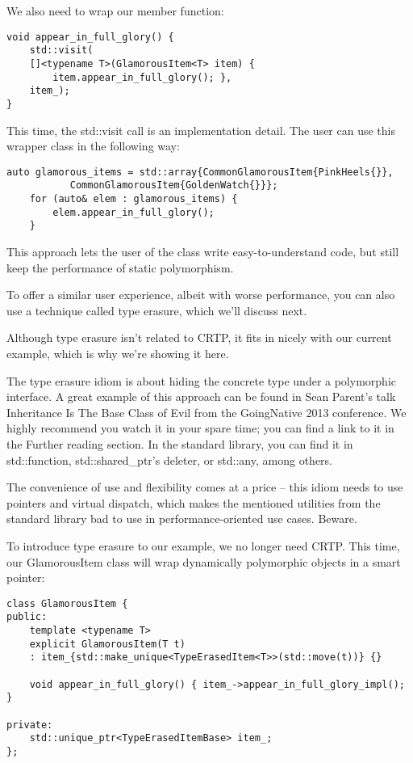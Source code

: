 We also need to wrap our member function:

\begin{lstlisting}[style=styleCXX]
void appear_in_full_glory() {
	std::visit(
	[]<typename T>(GlamorousItem<T> item) {
		item.appear_in_full_glory(); },
	item_);
}
\end{lstlisting}

This time, the std::visit call is an implementation detail. The user can use this wrapper class in the following way:

\begin{lstlisting}[style=styleCXX]
auto glamorous_items = std::array{CommonGlamorousItem{PinkHeels{}},
		   CommonGlamorousItem{GoldenWatch{}}};
	for (auto& elem : glamorous_items) {
		elem.appear_in_full_glory();
	}
\end{lstlisting}

This approach lets the user of the class write easy-to-understand code, but still keep the performance of static polymorphism.

To offer a similar user experience, albeit with worse performance, you can also use a technique called type erasure, which we'll discuss next.


Although type erasure isn't related to CRTP, it fits in nicely with our current example, which is why we're showing it here.

The type erasure idiom is about hiding the concrete type under a polymorphic interface. A great example of this approach can be found in Sean Parent's talk Inheritance Is The Base Class of Evil from the GoingNative 2013 conference. We highly recommend you watch it in your spare time; you can find a link to it in the Further reading section. In the standard library, you can find it in std::function, std::shared\_ptr's deleter, or std::any, among others.

The convenience of use and flexibility comes at a price – this idiom needs to use pointers and virtual dispatch, which makes the mentioned utilities from the standard library bad to use in performance-oriented use cases. Beware.

To introduce type erasure to our example, we no longer need CRTP. This time, our GlamorousItem class will wrap dynamically polymorphic objects in a smart pointer:

\begin{lstlisting}[style=styleCXX]
class GlamorousItem {
public:
	template <typename T>
	explicit GlamorousItem(T t)
	: item_{std::make_unique<TypeErasedItem<T>>(std::move(t))} {}
	
	void appear_in_full_glory() { item_->appear_in_full_glory_impl(); }
	
private:
	std::unique_ptr<TypeErasedItemBase> item_;
};
\end{lstlisting}

